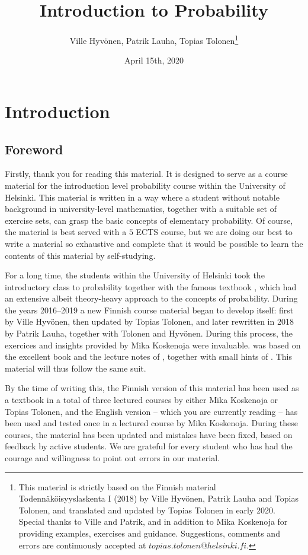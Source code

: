 \documentclass[12pt,a4paper,leqno]{report}
\title{Introduction to Probability}
\author{Ville Hyvönen, Patrik Lauha, Topias Tolonen\thanks{This material is strictly based on the Finnish material Todennäköisyyslaskenta I (2018) by Ville Hyvönen, Patrik Lauha and Topias Tolonen, and translated and updated by Topias Tolonen in early 2020. Special thanks to Ville and Patrik, and in addition to Mika Koskenoja for providing examples, exercises and guidance. Suggestions, comments and errors are continuously accepted at $topias.tolonen@helsinki.fi$.}}
\date{April 15th, 2020}
\theoremstyle{plain}
\theoremstyle{definition}
\begin{document}
\maketitle

\tableofcontents


\chapter{Introduction}\label{intro}

\section{Foreword}

Firstly, thank you for reading this material. It is designed to serve as a course material for the introduction level probability course within the University of Helsinki. This material is written in a way where a student without notable background in university-level mathematics, together with a suitable set of exercise sets, can grasp the basic concepts of elementary probability. Of course, the material is best served with a $5$ ECTS course, but we are doing our best to write a material so exhaustive and complete that it would be possible to learn the contents of this material by self-studying.

For a long time, the students within the University of Helsinki took the introductory class to probability together with the famous textbook \textcite{Tuominen2010}, which had an extensive albeit theory-heavy approach to the concepts of probability. During the years 2016--2019 a new Finnish course material began to develop itself: first by Ville Hyvönen, then updated by Topias Tolonen, and later rewritten in 2018 by Patrik Lauha, together with Tolonen and Hyvönen. During this process, the exercices and insights provided by Mika Koskenoja were invaluable. \textcite{Lauha} was based on the excellent book \textcite{Ross} and the lecture notes of \textcite{Koistinen2013}, together with small hints of \textcite{Stirzaker}. This material will thus follow the same suit. 

By the time of writing this, the Finnish version of this material has been used as a textbook in a total of three lectured courses by either Mika Koskenoja or Topias Tolonen, and the English version -- which you are currently reading -- has been used and tested once in a lectured course by Mika Koskenoja. During these courses, the material has been updated and mistakes have been fixed, based on feedback by active students. We are grateful for every student who has had the courage and willingness to point out errors in our material.
\end{document}
